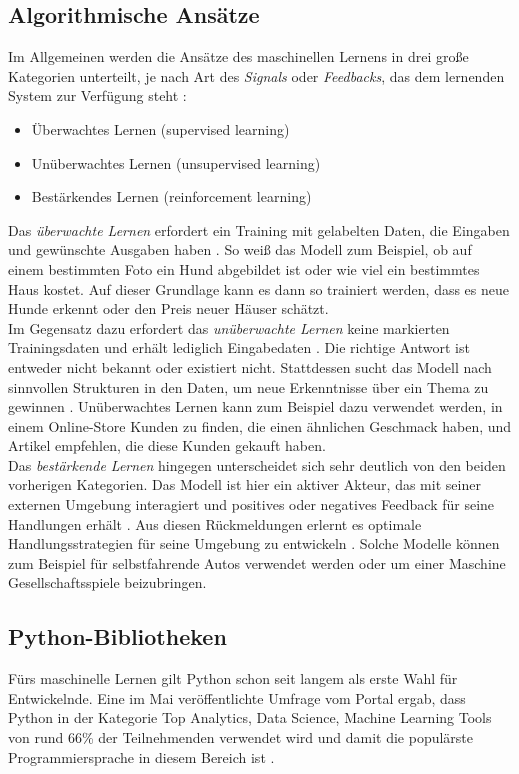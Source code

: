 \documentclass[german,bachelor]{swsLeipzig}
\begin{document}
\subsection{Algorithmische Ansätze}
Im Allgemeinen werden die Ansätze des maschinellen Lernens in drei große Kategorien unterteilt, je nach Art des \textit{Signals}
oder \textit{Feedbacks}, das dem lernenden System zur Verfügung steht \cite[S. 2]{FRADKOV20201385}:
\begin{itemize}
 \item Überwachtes Lernen (supervised learning)
 \item Unüberwachtes Lernen (unsupervised learning)
 \item Bestärkendes Lernen (reinforcement learning)
\end{itemize}

Das \textit{überwachte Lernen} erfordert ein Training mit gelabelten Daten, die Eingaben und gewünschte Ausgaben haben \cite[S. 2]{cite-key}.
So weiß das Modell zum Beispiel, ob auf einem bestimmten Foto ein Hund abgebildet ist oder wie viel ein bestimmtes Haus kostet.
Auf dieser Grundlage kann es dann so trainiert werden, dass es neue Hunde erkennt oder den Preis neuer Häuser schätzt. \\

Im Gegensatz dazu erfordert das \textit{unüberwachte Lernen} keine markierten Trainingsdaten und erhält lediglich Eingabedaten \cite[S. 2]{cite-key}.
Die richtige Antwort ist entweder nicht bekannt oder existiert nicht.
Stattdessen sucht das Modell nach sinnvollen Strukturen in den Daten, um neue Erkenntnisse über ein Thema zu gewinnen \cite[S. 383]{mahesh2020machine}.
Unüberwachtes Lernen kann zum Beispiel dazu verwendet werden, in einem Online-Store Kunden zu finden, die einen ähnlichen Geschmack haben,
und Artikel empfehlen, die diese Kunden gekauft haben. \\

Das \textit{bestärkende Lernen} hingegen unterscheidet sich sehr deutlich von den beiden vorherigen Kategorien.
Das Modell ist hier ein aktiver Akteur, das mit seiner externen Umgebung interagiert
und positives oder negatives Feedback für seine Handlungen erhält \cite[S. 2]{cite-key}.
Aus diesen Rückmeldungen erlernt es optimale Handlungsstrategien für seine Umgebung zu entwickeln \cite[S. 384]{mahesh2020machine}.
Solche Modelle können zum Beispiel für selbstfahrende Autos verwendet werden oder um einer Maschine Gesellschaftsspiele beizubringen.

\subsection{Python-Bibliotheken}
Fürs maschinelle Lernen gilt Python schon seit langem als erste Wahl für Entwickelnde.
Eine im Mai \citeyear{nugget} veröffentlichte Umfrage vom Portal \citeauthor{nugget} ergab, dass Python in der Kategorie
\glqq Top Analytics, Data Science, Machine Learning Tools\grqq{} von rund 66\% der Teilnehmenden verwendet wird
und damit die populärste Programmiersprache in diesem Bereich ist \cite{nugget}. \\
\end{document}
